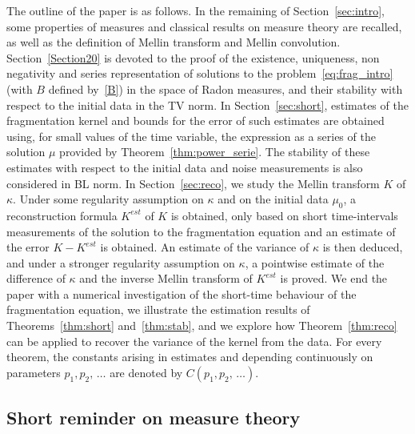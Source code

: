 \documentclass[10pt]{amsart}
\theoremstyle{definition}\newtheorem{defi}[theo]{Definition}\newtheorem{rema}[theo]{Remark}\newtheorem{exam}[theo]{Example}\newtheorem{exem}[theo]{Example}\newtheorem{nota}[theo]{Notation}
\begin{document}
The outline of the paper is as follows.
In the remaining of Section~\ref{sec:intro}, some properties of measures and classical results on measure theory are recalled, as well as the definition of Mellin transform and Mellin convolution. Section~\ref{Section20} is devoted to the proof of the existence, uniqueness, non negativity and series representation of solutions to the problem~\eqref{eq:frag_intro} (with $B$ defined by~\eqref{B}) in the space of Radon measures, and their stability with respect to the initial data in the TV norm. In Section~\ref{sec:short}, estimates of the fragmentation kernel and bounds for the error of such estimates are obtained using, for small values of the time variable, the expression as a series of the solution $\mu$ provided by Theorem~\ref{thm:power_serie}. The stability of these estimates with respect to the initial data and noise measurements is also considered in BL norm. In Section~\ref{sec:reco}, we study the Mellin transform $K$ of $\kappa $. Under some regularity assumption on $\kappa $ and on the initial data $\mu _0$, a reconstruction formula $K^{est}$ of $K$ is obtained, only based on short time-intervals measurements of the solution to the fragmentation equation and an estimate of the error $K-K^{est}$ is obtained. An estimate of the variance of $\kappa $ is then deduced, and under a stronger regularity assumption on $\kappa $, a pointwise estimate of the difference of $\kappa$ and the inverse Mellin transform of $K^{est}$ is proved. We end the paper with a numerical investigation of the short-time behaviour of the fragmentation equation, we illustrate the estimation results of Theorems~\ref{thm:short} and~\ref{thm:stab}, and we explore how Theorem~\ref{thm:reco} can be applied to recover the variance of the kernel from the data.
For every theorem, the constants arising in estimates and depending continuously on parameters $p_1,p_2,\, \dots$ are denoted by $C(p_1,p_2,\,\dots)$.


\subsection{Short reminder on measure theory}
\end{document}

